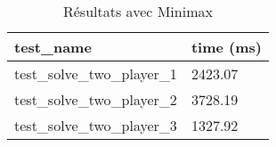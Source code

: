 \begin{table}[!ht]
    \centering
    \begin{tabular}{@{}ll@{}}
        \toprule
        test\_name & time (ms) \\ \midrule
        test\_solve\_two\_player\_1 & 2423.07   \\
        test\_solve\_two\_player\_2 & 3728.19   \\
        test\_solve\_two\_player\_3 & 1327.92   \\ \bottomrule
    \end{tabular}
    \caption{R\'esultats avec Minimax}
    \label{tab:my-table}
\end{table}
